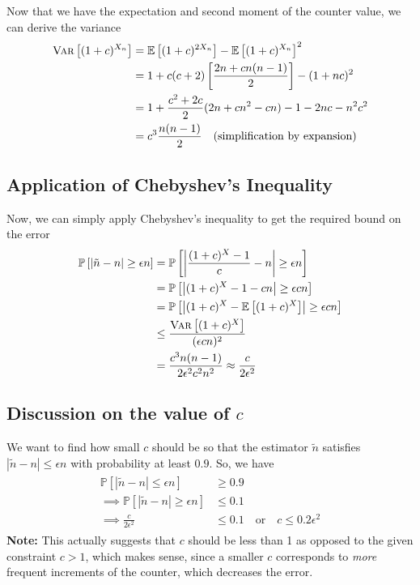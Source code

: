 \documentclass[9pt]{article}
\newcommand{\Probability}[1]{\mathbb{P}\left[ #1 \right]}
\newcommand{\Expectation}[1]{\mathbb{E}\left[ #1 \right]}
\newcommand{\Variance}[1]{\textsc{Var}\left[ #1 \right]}
\begin{document}
Now that we have the expectation and second moment of the counter value, we can derive
the variance
\begin{align}
    \begin{split}
        \Variance{(1 + c)^{X_{n}}} &= \Expectation{(1 + c)^{2X_{n}}} - \Expectation{(1 + c)^{X_{n}}}^{2} \\
        &= 1 + c (c + 2) \left[ \frac{2n + cn(n-1)}{2} \right] - (1 + nc)^{2} \\
        &= 1 + \frac{c^{2} + 2c}{2} (2n + cn^{2} - cn) - 1 - 2nc - n^{2}c^{2} \\
        &= c^{3} \frac{n (n - 1)}{2} \quad \text{(simplification by expansion)}
    \end{split}
\end{align}

\subsection*{\textbf{Application of Chebyshev's Inequality}}
Now, we can simply apply Chebyshev's inequality to get the required bound on the error
\begin{align}
    \begin{split}
        \Probability{\left| \tilde{n} - n \right| \geq \epsilon n}
        &= \Probability{\left| \frac{(1 + c)^{X} - 1}{c} - n \right| \geq \epsilon n} \\
        &= \Probability{\left| (1 + c)^{X} - 1 - cn \right| \geq \epsilon cn} \\
        &= \Probability{\left| (1 + c)^{X} - \Expectation{(1 + c)^{X}} \right| \geq \epsilon cn} \\
        &\leq \frac{\Variance{(1 + c)^{X}}}{(\epsilon cn)^{2}} \\
        &= \frac{c^{3} n (n-1)}{2 \epsilon^{2} c^{2} n^{2}}
        \approx \frac{c}{2 \epsilon^{2}}
    \end{split}
\end{align}

\subsection*{\textbf{Discussion on the value of $c$}}
We want to find how small $c$ should be so that the estimator $\tilde{n}$ satisfies
$\left| \tilde{n} - n \right| \leq \epsilon n$ with probability at least $0.9$. So, we have
\begin{align}
    \begin{split}
        \Probability{\left| \tilde{n} - n \right| \leq \epsilon n} &\geq 0.9 \\
        \implies
        \Probability{\left| \tilde{n} - n \right| \geq \epsilon n} &\leq 0.1 \\
        \implies \frac{c}{2 \epsilon^{2}} &\leq 0.1
        \quad \text{or} \quad c \leq 0.2 \epsilon^{2}
    \end{split}
\end{align}
\textbf{Note:} This actually suggests that $c$ should be less than 1 as opposed to the
given constraint $c > 1$, which makes sense, since a smaller $c$ corresponds to \textit{more}
frequent increments of the counter, which decreases the error.
\end{document}
